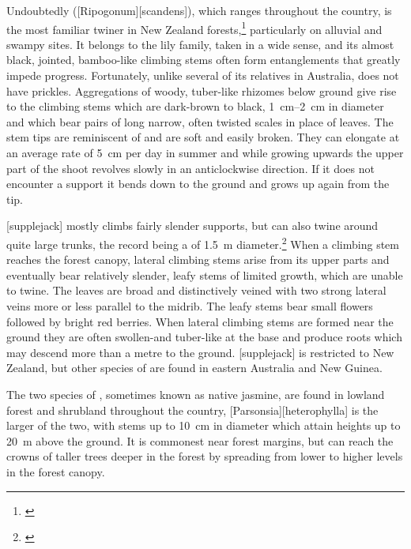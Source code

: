 Undoubtedly  ([Ripogonum][scandens]), which ranges throughout the country, is the most familiar twiner in New Zealand forests,\footnote{\cite{macmillan1973biological}} particularly on alluvial and swampy sites.
It belongs to the lily family, taken in a wide sense, and its almost black, jointed, bamboo-like climbing stems often form entanglements that greatly impede progress.
Fortunately, unlike several of its relatives in Australia,  does not have prickles.
Aggregations of woody, tuber-like rhizomes below ground give rise to the climbing stems which are dark-brown to black, \SIrange{1}{2}{\centi\metre} in diameter and which bear pairs of long narrow, often twisted scales in place of leaves.
The stem tips are reminiscent of  and are soft and easily broken.
They can elongate at an average rate of \SI{5}{\centi\metre} per day in summer and while growing upwards the upper part of the shoot revolves slowly in an anticlockwise direction.
If it does not encounter a support it bends down to the ground and grows up again from the tip.

[supplejack] mostly climbs fairly slender supports, but can also twine around quite large trunks, the record being a  of \SI{1.5}{\metre} diameter.\footnote{\cite{macmillan1973biological}}
When a climbing stem reaches the forest canopy, lateral climbing stems arise from its upper parts and eventually bear relatively slender, leafy stems of limited growth, which are unable to twine.
The leaves are broad and distinctively veined with two strong lateral veins more or less parallel to the midrib.
The leafy stems bear small flowers followed by bright red berries.
When lateral climbing stems are formed near the ground they are often swollen-and tuber-like at the base and produce roots which may descend more than a metre to the ground.
[supplejack] is restricted to New Zealand, but other species of  are found in eastern Australia and New Guinea.

The two species of , sometimes known as native jasmine, are found in lowland forest and shrubland throughout the country, [Parsonsia][heterophylla] is the larger of the two, with stems up to \SI{10}{\centi\metre} in diameter which attain heights up to \SI{20}{\metre} above the ground.
It is commonest near forest margins, but can reach the crowns of taller trees deeper in the forest by spreading from lower to higher levels in the forest canopy.

